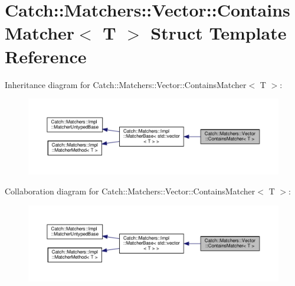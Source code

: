 \hypertarget{structCatch_1_1Matchers_1_1Vector_1_1ContainsMatcher}{}\section{Catch\+::Matchers\+::Vector\+::Contains\+Matcher$<$ T $>$ Struct Template Reference}
\label{structCatch_1_1Matchers_1_1Vector_1_1ContainsMatcher}


Inheritance diagram for Catch\+::Matchers\+::Vector\+::Contains\+Matcher$<$ T $>$\+:
\nopagebreak
\begin{figure}[H]
\begin{center}
\leavevmode
\includegraphics[width=350pt]{structCatch_1_1Matchers_1_1Vector_1_1ContainsMatcher__inherit__graph}
\end{center}
\end{figure}


Collaboration diagram for Catch\+::Matchers\+::Vector\+::Contains\+Matcher$<$ T $>$\+:
\nopagebreak
\begin{figure}[H]
\begin{center}
\leavevmode
\includegraphics[width=350pt]{structCatch_1_1Matchers_1_1Vector_1_1ContainsMatcher__coll__graph}
\end{center}
\end{figure}
